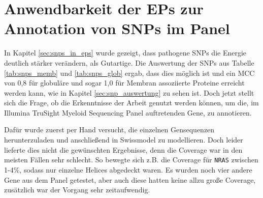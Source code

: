 \section{Anwendbarkeit der EPs zur Annotation von SNPs im Panel}

In Kapitel \ref{sec:snps_in_eps} wurde gezeigt, dass pathogene \ac{SNP}s die Energie deutlich stärker verändern, als Gutartige.  Die Auswertung der \ac{SNP}s aus Tabelle \ref{tab:snps_memb} und \ref{tab:snps_glob} ergab, dass dies möglich ist und ein MCC von 0,8 für globuläre und sogar 1,0 für Membran assoziierte Proteine erreicht werden kann, wie in Kapitel \ref{sec:snp_auswertung} zu sehen ist. Doch jetzt stellt sich die Frage, ob die Erkenntnisse der Arbeit genutzt werden können, um die, im Illumina TruSight Myeloid Sequencing Panel auftretenden Gene, zu annotieren. 

Dafür wurde zuerst per Hand versucht, die einzelnen Gensequenzen herunterzuladen und anschließend in Swissmodel zu modellieren. Doch leider lieferte dies nicht die gewünschten Ergebnisse, denn die Coverage war in den meisten Fällen sehr schlecht. So bewegte sich z.B. die Coverage für \texttt{NRAS} zwischen 1-4\%, sodass nur einzelne Helices abgedeckt waren. Es wurden noch vier andere Gene aus dem Panel getestet, aber auch diese hatten keine allzu große Coverage, zusätzlich war der Vorgang sehr zeitaufwendig. 

\begin{table}[H]
    \centering
    \caption{Illumina TruSight Myeloid Sequencing Panel Gene \emph{coverage}, Transkriptlänge ist mit UTRs und CDS angegeben.}
    \label{tab:illumina_coverage}
\end{table}

